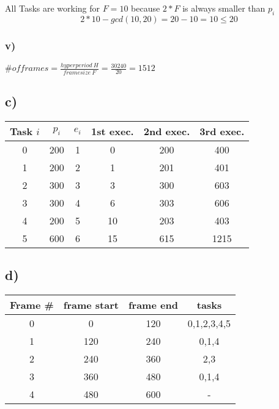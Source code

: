 \documentclass[10pt,a4paper]{article}
\begin{document}
All Tasks are working for $F=10$ because $2*F$ is always smaller than $p_i$
\begin{equation}
2 * 10 - gcd(10, 20) = 20 - 10 = 10 \leq 20
\end{equation}


\subsubsection*{v)}
$\# of frames = \frac{hyperperiod ~H}{framesize ~F} = \frac{30240}{20} = 1512$ 

\subsection*{c)}

\begin{tabular}{| c | c | c || c | c | c |}
  \hline
  Task $i$ & $p_i$ & $e_i$ & 1st exec. & 2nd exec. & 3rd exec. \\
  \hline
  0 & 200 & 1 & 0 & 200 & 400 \\
  \hline
  1 & 200 & 2 & 1 & 201 & 401 \\
  \hline
  2 & 300 & 3 & 3 & 300 & 603 \\
  \hline
  3 & 300 & 4 & 6 & 303 & 606 \\
  \hline
  4 & 200 & 5 & 10 & 203 & 403 \\
  \hline
  5 & 600 & 6 & 15 & 615 & 1215 \\
  \hline
\end{tabular}

\subsection*{d)}
\begin{tabular}{| c | c | c | c |}
\hline
Frame \# & frame start & frame end & tasks \\
\hline
0 & 0 & 120 & 0,1,2,3,4,5 \\
\hline
1 & 120 & 240 & 0,1,4 \\
\hline
2 & 240 & 360 & 2,3 \\
\hline
3 & 360 & 480 & 0,1,4 \\
\hline
4 & 480 & 600 & - \\
\hline
\end{tabular}
\end{document}
